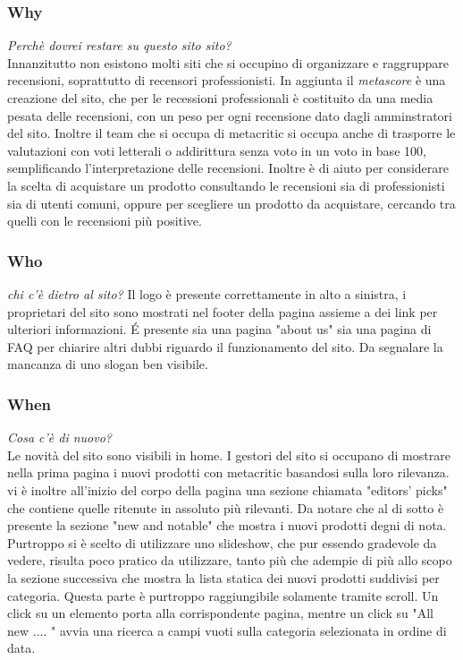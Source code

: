 \documentclass[12pt]{article}
\begin{document}
\subsubsection{Why}
\textit{Perchè dovrei restare su questo sito sito?}\\
Innanzitutto non esistono molti siti che si occupino di organizzare e raggruppare recensioni, soprattutto di recensori professionisti. In aggiunta il \textit{metascore} è una creazione del sito, che per le recessioni professionali è costituito da una media pesata delle recensioni, con un peso per ogni recensione dato dagli amminstratori del sito. Inoltre il team che si occupa di metacritic si occupa anche di trasporre le valutazioni con voti letterali o addirittura senza voto in un voto in base 100, semplificando l'interpretazione delle recensioni. Inoltre è di aiuto per considerare la scelta di acquistare un prodotto consultando le recensioni sia di professionisti sia di utenti comuni, oppure per scegliere un prodotto da acquistare, cercando tra quelli con le recensioni più positive.
\subsubsection{Who}
\textit{chi c'è dietro al sito?}
Il logo è presente correttamente in alto a sinistra, i proprietari del sito sono mostrati nel footer della pagina assieme a dei link per ulteriori informazioni. \'E presente sia una pagina "about us" sia una pagina di FAQ per chiarire altri dubbi riguardo il funzionamento del sito. Da segnalare la mancanza di uno slogan ben visibile.
\subsubsection{When}
\textit{Cosa c'è di nuovo?}\\
Le novità del sito sono visibili in home. I gestori del sito si occupano di mostrare nella prima pagina i nuovi prodotti con metacritic basandosi sulla loro rilevanza. vi è inoltre all'inizio del corpo della pagina una sezione chiamata "editors' picks" che contiene quelle ritenute in assoluto più rilevanti. Da notare che al di sotto è presente la sezione "new and notable" che mostra i nuovi prodotti degni di nota. Purtroppo si è scelto di utilizzare uno slideshow, che pur essendo gradevole da vedere, risulta poco pratico da utilizzare, tanto più che adempie di più allo scopo la sezione successiva che mostra la lista statica dei nuovi prodotti suddivisi per categoria. Questa parte è purtroppo raggiungibile solamente tramite scroll. Un click su un elemento porta alla corrispondente pagina, mentre un click su "All new .... " avvia una ricerca a campi vuoti sulla categoria selezionata in ordine di data.
\end{document}
